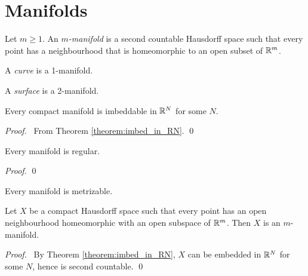 \section{Manifolds}

\begin{definition}[Manifold]
    Let $m \geq 1$. An \emph{$m$-manifold} is a second countable Hausdorff space such that every point has a neighbourhood that is
    homeomorphic to an open subset of $\mathbb{R}^m$.

    A \emph{curve} is a 1-manifold.

    A \emph{surface} is a 2-manifold.
\end{definition}

\begin{theorem}
    Every compact manifold is imbeddable in $\mathbb{R}^N$ for some $N$.
\end{theorem}

\begin{proof}
    \pf\ From Theorem \ref{theorem:imbed_in_RN}. \qed
\end{proof}

\begin{proposition}
    Every manifold is regular.
\end{proposition}

\begin{proof}
    \pf
    \qed
\end{proof}

\begin{corollary}
    Every manifold is metrizable.
\end{corollary}

\begin{proposition}
    Let $X$ be a compact Hausdorff space such that every point has an open neighbourhood homeomorphic with an open subspace of $\mathbb{R}^m$.
    Then $X$ is an $m$-manifold.
\end{proposition}

\begin{proof}
    \pf\ By Theorem \ref{theorem:imbed_in_RN}, $X$ can be embedded in $\mathbb{R}^N$ for some $N$, hence is second countable. \qed
\end{proof}